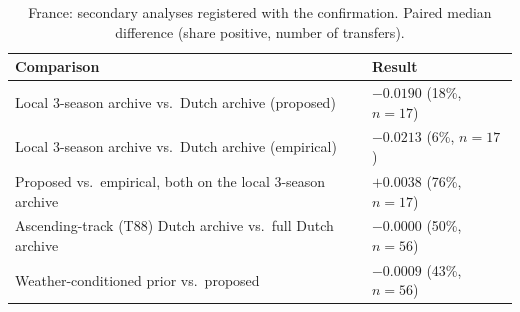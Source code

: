 \begin{table}[!t]
\caption{France: secondary analyses registered with the confirmation. Paired median difference (share positive, number of transfers).}
\label{tab:s_fr}
\centering\footnotesize
\begin{tabular}{@{}p{4.6cm}l@{}}
\toprule
Comparison & Result\\
\midrule
Local 3-season archive vs.\ Dutch archive (proposed) & $-0.0190$ (18\%, $n=17$)\\
Local 3-season archive vs.\ Dutch archive (empirical) & $-0.0213$ (6\%, $n=17$)\\
Proposed vs.\ empirical, both on the local 3-season archive & $+0.0038$ (76\%, $n=17$)\\
Ascending-track (T88) Dutch archive vs.\ full Dutch archive & $-0.0000$ (50\%, $n=56$)\\
Weather-conditioned prior vs.\ proposed & $-0.0009$ (43\%, $n=56$)\\
\bottomrule
\end{tabular}
\end{table}